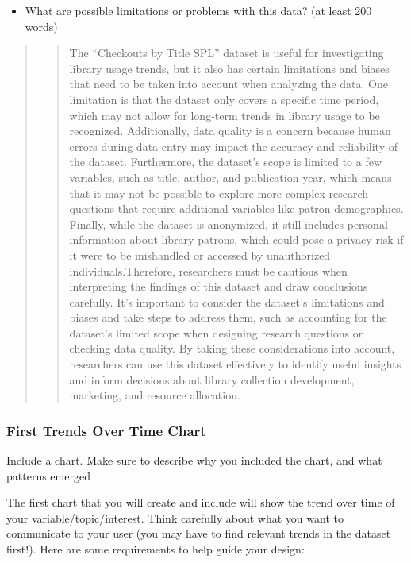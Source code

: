 \documentclass[
]{article}
\providecommand{\tightlist}{%
  \setlength{\itemsep}{0pt}\setlength{\parskip}{0pt}}
\begin{document}
\begin{itemize}
\tightlist
\item
  What are possible limitations or problems with this data? (at least
  200 words)
\end{itemize}

\begin{quote}
\begin{quote}
The ``Checkouts by Title SPL'' dataset is useful for investigating
library usage trends, but it also has certain limitations and biases
that need to be taken into account when analyzing the data. One
limitation is that the dataset only covers a specific time period, which
may not allow for long-term trends in library usage to be recognized.
Additionally, data quality is a concern because human errors during data
entry may impact the accuracy and reliability of the dataset.
Furthermore, the dataset's scope is limited to a few variables, such as
title, author, and publication year, which means that it may not be
possible to explore more complex research questions that require
additional variables like patron demographics. Finally, while the
dataset is anonymized, it still includes personal information about
library patrons, which could pose a privacy risk if it were to be
mishandled or accessed by unauthorized individuals.Therefore,
researchers must be cautious when interpreting the findings of this
dataset and draw conclusions carefully. It's important to consider the
dataset's limitations and biases and take steps to address them, such as
accounting for the dataset's limited scope when designing research
questions or checking data quality. By taking these considerations into
account, researchers can use this dataset effectively to identify useful
insights and inform decisions about library collection development,
marketing, and resource allocation.
\end{quote}
\end{quote}

\hypertarget{first-trends-over-time-chart}{%
\subsubsection{First Trends Over Time
Chart}\label{first-trends-over-time-chart}}

Include a chart. Make sure to describe why you included the chart, and
what patterns emerged

The first chart that you will create and include will show the trend
over time of your variable/topic/interest. Think carefully about what
you want to communicate to your user (you may have to find relevant
trends in the dataset first!). Here are some requirements to help guide
your design:
\end{document}
